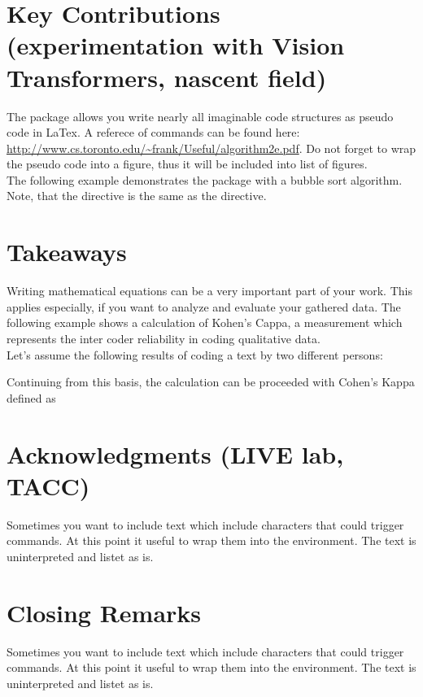 \section{Key Contributions (experimentation with Vision Transformers, nascent field)}


The package  allows you write nearly all imaginable code structures as pseudo code in LaTex. A referece of commands can be found here: \url{http://www.cs.toronto.edu/~frank/Useful/algorithm2e.pdf}. Do not forget to wrap the pseudo code into a figure, thus it will be included into list of figures.\\

The following example demonstrates the package with a bubble sort algorithm. Note, that the directive  is the same as the  directive.


\newpage
\section{Takeaways}

Writing mathematical equations can be a very important part of your work. This applies especially, if you want to analyze and evaluate your gathered data. The following example shows a calculation of Kohen's Cappa, a measurement which represents the inter coder reliability in coding qualitative data.\\

Let's assume the following results of coding a text by two different persons:


Continuing from this basis, the calculation can be proceeded with Cohen's Kappa defined as


\section{Acknowledgments (LIVE lab, TACC)}

Sometimes you want to include text which include characters that could trigger commands. At this point it useful to wrap them into the  environment. The text is uninterpreted and listet as is.


\section{Closing Remarks}

Sometimes you want to include text which include characters that could trigger commands. At this point it useful to wrap them into the  environment. The text is uninterpreted and listet as is.
